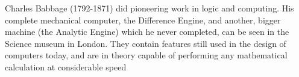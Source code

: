 Charles Babbage (1792-1871) did pioneering work in logic
and computing. His complete mechanical computer, the Difference
Engine, and another, bigger machine (the Analytic Engine) which he
never completed, can be seen in the Science museum in London. They
contain features still used in the design of computers today, and
are in theory capable of performing any mathematical calculation
at considerable speed